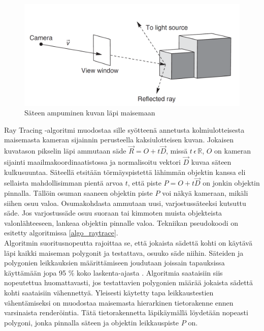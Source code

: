 ﻿\documentclass[a4paper,12pt, titlepage]{article}
\newcommand{\R}{\mathbb{R}}
\begin{document}
\begin{figure}
 \centering 
 \includegraphics[width=\textwidth]{img/raytracing.png}
 \vspace{0.5cm}
 \caption{Säteen ampuminen kuvan läpi maisemaan \citep{janke}}
 \label{raytracing}
\end{figure}

Ray Tracing -algoritmi muodostaa sille syötteenä annetusta kolmiulotteisesta maisemasta kameran sijainnin perusteella kaksiulotteisen kuvan. Jokaisen kuvatason pikselin läpi ammutaan säde $\vec{R}=O+t\vec{D}$, missä $t\,\epsilon\,\R$, $O$ on kameran sijainti maailmakoordinaatistossa ja normalisoitu vektori $\vec{D}$ kuvaa säteen kulkusuuntaa. Säteellä etsitään törmäyspistettä lähimmän objektin kanssa eli sellaista mahdollisimman pientä arvoa $t$, että piste $P=O+t\vec{D}$ on jonkin objektin pinnalla. Tällöin osuman saaneen objektin piste $P$ voi näkyä kameraan, mikäli siihen osuu valoa. Osumakohdasta ammutaan uusi, varjostussäteeksi kutsuttu säde. Jos varjostussäde osuu suoraan tai kimmoten muista objekteista valonlähteeseen, lankeaa objektin pinnalle valoa. \citep[.]{janke} Tekniikan pseudokoodi on esitetty algoritmissa \ref{algo_raytrace}.\\




Algoritmin suoritusnopeutta rajoittaa se, että jokaista sädettä kohti on käytävä läpi kaikki maiseman polygonit ja testattava, osuuko säde niihin. Säteiden ja polygonien leikkauksien määrittämiseen joudutaan joissain tapauksissa käyttämään jopa 95 \% koko laskenta-ajasta \citep{whitted}. Algoritmia saataisiin siis nopeutettua huomattavasti, jos testattavien polygonien määrää jokaista sädettä kohti saataisiin vähennettyä. Yleisesti käytetty tapa leikkaustestien vähentämiseksi on muodostaa maisemasta hierarkinen tietorakenne ennen varsinaista renderöintia. Tätä tietorakennetta läpikäymällä löydetään nopeasti polygoni, jonka pinnalla säteen ja objektin leikkauspiste $P$ on. \citep[.]{rubin}
\end{document}
